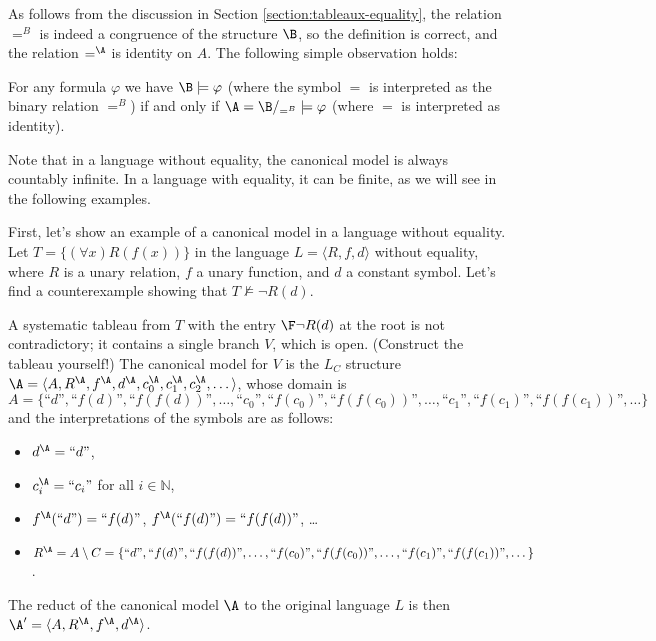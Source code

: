 As follows from the discussion in Section \ref{section:tableaux-equality}, the relation $=^B$ is indeed a congruence of the structure $\B$, so the definition is correct, and the relation $=^\A$ is identity on $A$. The following simple observation holds:

\begin{observation}\label{canonical-with-equality-satisfies-the-same}
    For any formula $\varphi$ we have $\B\models\varphi$ (where the symbol $=$ is interpreted as the binary relation $=^B$) if and only if $\A=\B/_{=^B}\models\varphi$ (where $=$ is interpreted as identity).    
\end{observation}

Note that in a language without equality, the canonical model is always countably infinite. In a language with equality, it can be finite, as we will see in the following examples.

\begin{example}
    First, let's show an example of a canonical model in a language without equality. Let $T=\{(\forall x)R(f(x))\}$ in the language $L=\langle R,f,d \rangle$ without equality, where $R$ is a unary relation, $f$ a unary function, and $d$ a constant symbol. Let's find a counterexample showing that $T\not\models\neg R(d)$. 
    
    A systematic tableau from $T$ with the entry $\F\neg R(d)$ at the root is not contradictory; it contains a single branch $V$, which is open. (Construct the tableau yourself!) The canonical model for $V$ is the $L_C$ structure $\A=\langle A,R^\A,f^\A,d^\A,c_0^\A,c_1^\A,c_2^\A,\dots\rangle$, whose domain is
    $$
    A=\{\text{``$d$''},\text{``$f(d)$''},\text{``$f(f(d))$''},\dots,\text{``$c_0$''},\text{``$f(c_0)$''},\text{``$f(f(c_0))$''},\dots,\text{``$c_1$''},\text{``$f(c_1)$''},\text{``$f(f(c_1))$''},\dots\}
    $$
    and the interpretations of the symbols are as follows:
    \begin{itemize}
        \item $d^\A=\text{``$d$''}$,
        \item $c^\A_i=\text{``$c_i$''}$ for all $i\in \mathbb N$,
        \item $f^\A(\text{``$d$''})=\text{``$f(d)$''}$, $f^\A(\text{``$f(d)$''})=\text{``$f(f(d))$''}$, \dots
        \item $R^\A=A\setminus C=\{\text{``$d$''},\text{``$f(d)$''},\text{``$f(f(d))$''},\dots,\text{``$f(c_0)$''},\text{``$f(f(c_0))$''},\dots,\text{``$f(c_1)$''},\text{``$f(f(c_1))$''},\dots\}$.
    \end{itemize}
    The reduct of the canonical model $\A$ to the original language $L$ is then $\A'=\langle A, R^\A, f^\A, d^\A\rangle$.
\end{example}


